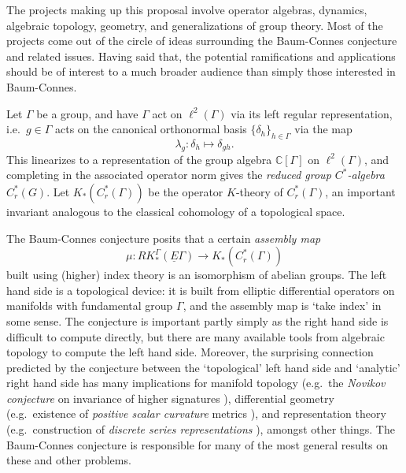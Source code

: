 \documentclass[11pt]{article}
\newcommand{\C}{\mathbb{C}}
\theoremstyle{plain}
\theoremstyle{definition}
\theoremstyle{remark}
\begin{document}
The projects making up this proposal involve operator algebras, dynamics, algebraic topology, geometry, and generalizations of group theory.  Most of the projects come out of the circle of ideas surrounding the Baum-Connes conjecture and related issues.  Having said that, the potential ramifications and applications should be of interest to a much broader audience than simply those interested in Baum-Connes.

Let $\Gamma$ be a group, and have $\Gamma$ act on $\ell^2(\Gamma)$ via its left regular representation, i.e.\ $g\in \Gamma$ acts on the canonical orthonormal basis $\{\delta_h\}_{h\in \Gamma}$ via the map 
$$
\lambda_g:\delta_h\mapsto \delta_{gh}.
$$
This linearizes to a representation of the group algebra $\C[\Gamma]$ on $\ell^2(\Gamma)$, and completing in the associated operator norm gives the \emph{reduced group $C^*$-algebra} $C^*_r(G)$.  Let $K_*(C^*_r(\Gamma))$ be the operator $K$-theory of $C^*_r(\Gamma)$, an important invariant analogous to the classical cohomology of a topological space.  

The Baum-Connes conjecture \cite{Baum:1994pr} posits that a certain \emph{assembly map}
\begin{equation}\label{bc ass}
\mu:RK_*^\Gamma(\underline{E}\Gamma)\to K_*(C^*_r(\Gamma))
\end{equation}
built using (higher) index theory is an isomorphism of abelian groups.  The left hand side is a topological device: it is built from elliptic differential operators on manifolds with fundamental group $\Gamma$, and the assembly map is `take index' in some sense.   The conjecture is important partly simply as the right hand side is difficult to compute directly, but there are many available tools from algebraic topology to compute the left hand side.  Moreover, the surprising connection predicted by the conjecture between the `topological' left hand side and `analytic' right hand side has many implications for manifold topology (e.g.\ the \emph{Novikov conjecture} on invariance of higher signatures \cite{Ferry:1993xw}), differential geometry (e.g.\ existence of \emph{positive scalar curvature} metrics \cite{Rosenberg:1983qy}), and representation theory (e.g.\ construction of \emph{discrete series representations} \cite{Lafforgue:2002zl}), amongst other things.  The Baum-Connes conjecture is responsible for many of the most general results on these and other problems.  
\end{document}
